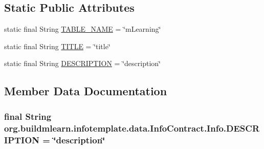 \subsection*{Static Public Attributes}
\begin{DoxyCompactItemize}
\item 
static final String \hyperlink{classorg_1_1buildmlearn_1_1infotemplate_1_1data_1_1InfoContract_1_1Info_a57dcca124ebee57d10fc9afc4d3081cb}{T\+A\+B\+L\+E\+\_\+\+N\+A\+ME} = \char`\"{}m\+Learning\char`\"{}
\item 
static final String \hyperlink{classorg_1_1buildmlearn_1_1infotemplate_1_1data_1_1InfoContract_1_1Info_a41e655ab9ba4acc17c1b3a3484b338fa}{T\+I\+T\+LE} = \char`\"{}title\char`\"{}
\item 
static final String \hyperlink{classorg_1_1buildmlearn_1_1infotemplate_1_1data_1_1InfoContract_1_1Info_a88f87a078928e6675402c6bd8ca4974a}{D\+E\+S\+C\+R\+I\+P\+T\+I\+ON} = \char`\"{}description\char`\"{}
\end{DoxyCompactItemize}


\subsection{Member Data Documentation}
\subsubsection[{\texorpdfstring{D\+E\+S\+C\+R\+I\+P\+T\+I\+ON}{DESCRIPTION}}]{\setlength{\rightskip}{0pt plus 5cm}final String org.\+buildmlearn.\+infotemplate.\+data.\+Info\+Contract.\+Info.\+D\+E\+S\+C\+R\+I\+P\+T\+I\+ON = \char`\"{}description\char`\"{}\hspace{0.3cm}{\ttfamily [static]}}\hypertarget{classorg_1_1buildmlearn_1_1infotemplate_1_1data_1_1InfoContract_1_1Info_a88f87a078928e6675402c6bd8ca4974a}{}\label{classorg_1_1buildmlearn_1_1infotemplate_1_1data_1_1InfoContract_1_1Info_a88f87a078928e6675402c6bd8ca4974a}
